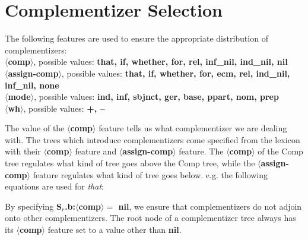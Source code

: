 \beginsentences
{}\label{ex:222} 
\label{ex:223} 
\endsentences

 
 
 
 
\section{Complementizer Selection} 
The following features are used to ensure the appropriate distribution 
of complementizers: 
\\ 
{\bf $\langle$comp$\rangle$}, possible values: {\bf that, if, whether, for, rel, inf\_nil, ind\_nil, nil}\\ 
{\bf $\langle$assign-comp$\rangle$}, possible values: {\bf that, if, whether, for, ecm, rel, ind\_nil, inf\_nil, none}\\ 
{\bf $\langle$mode$\rangle$}, possible values: {\bf ind, inf, sbjnct, ger, base, ppart, nom, prep}\\ 
{\bf $\langle$wh$\rangle$}, possible values: {\bf +, --} 
 
The value of the {\bf $\langle$comp$\rangle$} feature tells us what complementizer we 
are dealing with. The trees which introduce complementizers come 
specified from the lexicon with their 
{\bf $\langle$comp$\rangle$} feature and {\bf $\langle$assign-comp$\rangle$} 
feature. The {\bf $\langle$comp$\rangle$} of the Comp tree regulates 
what kind of tree goes above the Comp tree, while the 
{\bf $\langle$assign-comp$\rangle$} feature regulates what kind of tree 
goes below. 
e.g. 
the following equations are used for {\em that}: 
 
\beginsentences
{}\label{ex:224} 
\label{ex:225} 
\label{ex:226} 
\label{ex:227} 
\label{ex:228} 
\endsentences

 
By specifying {\bf S$_{r}$.b:$\langle$comp$\rangle =$ nil}, we ensure that 
complementizers do not adjoin onto other complementizers. The root node 
of a complementizer tree always has its {\bf $\langle$comp$\rangle$} feature 
set to a value other than {\bf nil}. 
 

